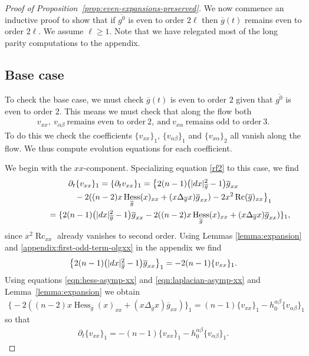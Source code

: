 \documentclass[11pt]{article}
\numberwithin{equation}{section}
\newcommand{\del}{\partial}
\newcommand{\olg}{\overline{g}}
\newcommand{\olgin}{\overline{\gin}}
\newcommand{\gin}{{g^0}}
\newcommand{\gbar}{\overline{g}}
\DeclareMathOperator{\Rc}{Rc}
\DeclareMathOperator{\hess}{Hess}
\begin{document}
\begin{proof}[Proof of Proposition~\ref{prop:even-expansions-preserved}]
We now commence an inductive proof to show that if $\olgin$ is even to order $2\ell$ then $\olg(t)$ remains even to order $2\ell$. We assume $\ell \geq 1$. Note that we have relegated most of the long parity computations to the appendix.

\subsection*{Base case}
To check the base case, we must check $\olg(t)$ is even to order $2$ given that $\olgin$ is even to order $2$. This means we must check that along the flow both
\begin{align*}
v_{xx}, \ v_{\alpha \beta}\ \mbox{remains even to order} \ 2, \ \mbox{and} \ v_{x\alpha} \ \mbox{remains odd to order} \ 3.
\end{align*}
To do this we check the coefficients $\{v_{xx}\}_1$, $\{v_{\alpha \beta}\}_1$ and $\{v_{x\alpha}\}_2$ all vanish along the flow. We thus compute evolution equations for each coefficient.

We begin with the $xx$-component. Specializing equation \eqref{rf2} to this case, we find
\begin{gather*}
\del_t \{ v_{xx} \}_{1} = \{ \del_t v_{xx}\}_{1}
 =\big\{ 2 (n-1) \big(|{\rm d}x|^2_{\gbar} -1\big) \olg_{xx} \\
 \hphantom{\del_t \{ v_{xx} \}_{1} =}{} -2 ( (n-2) x \hess_{\olg} (x)_{xx} + (x \Delta_{\olg} x) \olg_{xx} ) -2 x^2 \Rc(\gbar)_{xx}\big\}_1 \\
 \hphantom{\del_t \{ v_{xx} \}_{1}}{} =\{ 2 (n-1) \big(|{\rm d}x|^2_{\gbar} -1\big) \olg_{xx} -2 ( (n-2) x \hess_{\olg} (x)_{xx} + (x \Delta_{\olg} x) \olg_{xx} )\}_1,
\end{gather*}
since $x^2 \Rc_{xx}$ already vanishes to second order. Using Lemmas \ref{lemma:expansion} and \ref{appendix:first-odd-term-olgxx} in the appendix we find
\begin{gather*}
\big\{ 2 (n-1) \big(|{\rm d}x|^2_{\gbar} -1\big) \olg_{xx}\big\}_{1} = - 2(n-1) \{v_{xx}\}_1.
\end{gather*}
Using equations \eqref{eqn:hess-asymp-xx} and \eqref{eqn:laplacian-asymp-xx} and Lemma~\ref{lemma:expansion} we obtain
\begin{gather*}
\big\{{-}2 ( (n-2) x \hess_{\olg} (x)_{xx} + (x \Delta_{\olg} x) \olg_{xx} )\big\}_1 = (n-1) \{v_{xx}\}_1 - h_0^{\alpha \beta} \{v_{\alpha \beta}\}_{1}
\end{gather*}
so that
\begin{gather*}
\del_t \{ v_{xx} \}_{1} = -(n-1) \{v_{xx}\}_1 - h_0^{\alpha \beta} \{v_{\alpha \beta}\}_{1}.
\end{gather*}


\end{proof}
\end{document}
